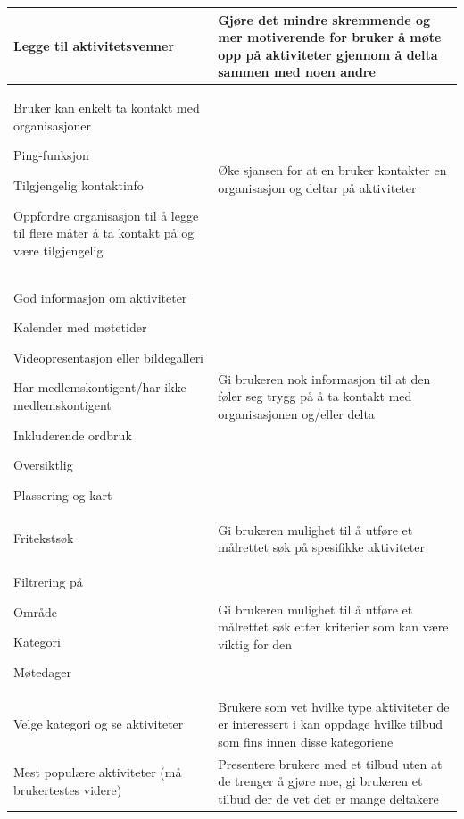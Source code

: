 \begin{center}
\begin{longtabu}{|X|X|}
Legge til aktivitetsvenner & 
Gjøre det mindre skremmende og mer motiverende for bruker å møte opp på aktiviteter gjennom å delta sammen med noen andre \\ \hline

Bruker kan enkelt ta kontakt med organisasjoner
\begin{compactitem}
    \item Ping-funksjon
    \item Tilgjengelig kontaktinfo
    \item Oppfordre organisasjon til å legge til flere måter å ta kontakt på og være tilgjengelig
\end{compactitem}
& Øke sjansen for at en bruker kontakter en organisasjon og deltar på aktiviteter \\ \hline

God informasjon om aktiviteter 
\begin{compactitem}
    \item Kalender med møtetider
    \item Videopresentasjon eller bildegalleri
    \item Har medlemskontigent/har ikke medlemskontigent
    \item Inkluderende ordbruk
    \item Oversiktlig
    \item Plassering og kart
\end{compactitem}
&  Gi brukeren nok informasjon til at den føler seg trygg på å ta kontakt med organisasjonen og/eller delta\\ \hline

Fritekstsøk
& Gi brukeren mulighet til å utføre et målrettet søk på spesifikke aktiviteter \\ \hline

Filtrering på
\begin{compactitem}
    \item Område
    \item Kategori
    \item Møtedager
\end{compactitem}
& Gi brukeren mulighet til å utføre et målrettet søk etter kriterier som kan være viktig for den \\ \hline

Velge kategori og se aktiviteter
& Brukere som vet hvilke type aktiviteter de er interessert i kan oppdage hvilke tilbud som fins innen disse kategoriene \\ \hline

Mest populære aktiviteter (må brukertestes videre) 
& Presentere brukere med et tilbud uten at de trenger å gjøre noe, gi brukeren et tilbud der de vet det er mange deltakere \\ \hline

\end{longtabu}
\end{center}


